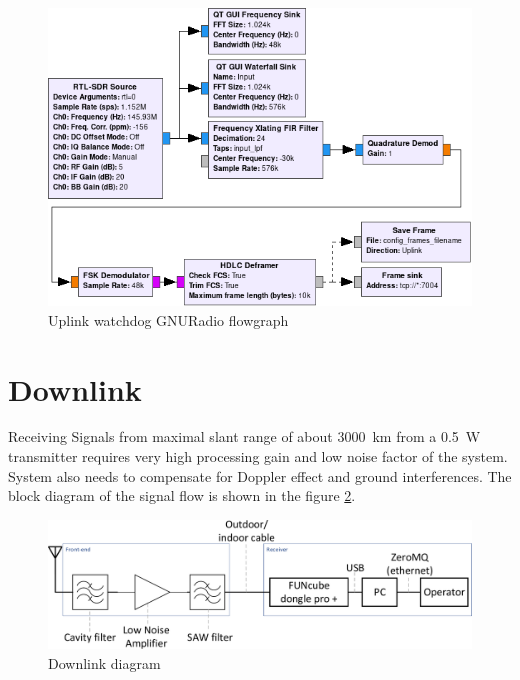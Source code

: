 \begin{figure}
    \centering
    \includegraphics[width=0.8\paperwidth]{img/5/uplink_watchdog_flowgraph.png}
    \caption{Uplink watchdog GNURadio flowgraph}
    \label{uplink_watchdog_flowgraph}
\end{figure}



\section{Downlink}
Receiving Signals from maximal slant range of about \SI{3000}{\kilo\meter} from a \SI{0.5}{\watt} transmitter requires very high processing gain and low noise factor of the system. System also needs to compensate for Doppler effect and ground interferences. The block diagram of the signal flow is shown in the figure \ref{downlink_diagram}.

\begin{figure}
    \centering
    \includegraphics[width=0.8\paperwidth]{img/5/downlink_diagram.pdf}
    \caption{Downlink diagram}
    \label{downlink_diagram}
\end{figure}

